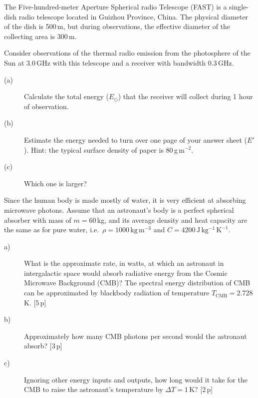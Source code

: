 The Five-hundred-meter Aperture Spherical radio Telescope (FAST) is a
single-dish radio telescope located in Guizhou Province, China. The physical
diameter of the dish is 500\,m, but during observations, the effective
diameter of the collecting area is 300\,m.

Consider observations of the thermal radio emission from the photosphere of
the Sun at 3.0\,GHz with this telescope and a receiver with bandwidth
0.3\,GHz.

\begin{description}
\item[(a)] Calculate the total energy ($E_\odot$) that the receiver will
  collect during 1 hour of observation.
\item[(b)] Estimate the energy needed to turn over one page of your answer
  sheet ($E'$). Hint: the typical surface density of paper is
  80\,g\,m$^{-2}$.
\item[(c)] Which one is larger?
\end{description}

Since the human body is made mostly of water, it is very efficient at
absorbing microwave photons. Assume that an astronaut's body is a perfect
spherical absorber with mass of $m = 60$\,kg, and its average density and heat
capacity are the same as for pure water, i.e.\
$\rho = 1000\,\mathrm{kg\,m^{-3}}$ and
$C = 4200\,\mathrm{J\,kg^{-1}\,K^{-1}}$.

\begin{description}
\item[a)] What is the approximate rate, in watts, at which an astronaut in
  intergalactic space would absorb radiative energy from the Cosmic Microwave
  Background (CMB)? The spectral energy distribution of CMB can be
  approximated by blackbody radiation of temperature
  $T_{\mathrm{CMB}} = 2.728$\,K. \hfill[5\,p]
\item[b)] Approximately how many CMB photons per second would the astronaut
  absorb? \hfill[3\,p]
\item[c)] Ignoring other energy inputs and outputs, how long would it take for
  the CMB to raise the astronaut's temperature by $\Delta T = 1$\,K?
  \hfill[2\,p]
\end{description}


